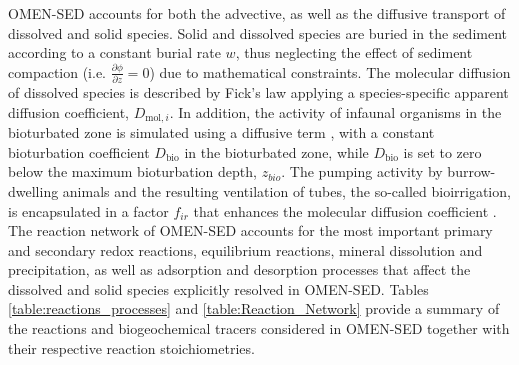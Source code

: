 \documentclass[gmd, manuscript]{copernicus}
\begin{document}
OMEN-SED accounts for both the advective, as well as the diffusive transport of dissolved and solid species. Solid and dissolved species are buried in the sediment according to a constant burial rate $w$, thus 
neglecting the effect of sediment compaction (i.e. $\frac{\partial \phi}{\partial z}=0$) due to mathematical constraints. 
The molecular diffusion of dissolved species is described by Fick's law applying a species-specific apparent diffusion coefficient, $D_{\mathrm{mol},i}$.  In addition, the activity of infaunal organisms in the bioturbated zone 
is simulated using a diffusive term \citep[e.g.][]{boudreau_mathematics_1986}, with a constant bioturbation coefficient $D_{\mathrm{bio}}$ in the bioturbated zone, 
while $D_{\mathrm{bio}}$ is set to zero below the maximum bioturbation depth, $z_{bio}$. 
The pumping activity by burrow-dwelling animals and the resulting ventilation of tubes, the so-called bioirrigation, is encapsulated in a factor $f_{ir}$ that enhances the molecular diffusion coefficient 
\citep[hence, $D_{i,0}=D_{\mathrm{mol},i}\cdot f_{ir}$,][]{soetaert_model_1996}. 
The reaction network of OMEN-SED accounts for the most important primary and secondary redox reactions, equilibrium reactions, mineral dissolution and precipitation, as well as adsorption and desorption processes that affect 
the dissolved and solid species explicitly resolved in OMEN-SED. Tables \ref{table:reactions_processes} and \ref{table:Reaction_Network} provide a summary of the reactions and biogeochemical tracers considered in OMEN-SED together 
with their respective reaction stoichiometries. %
\end{document}

